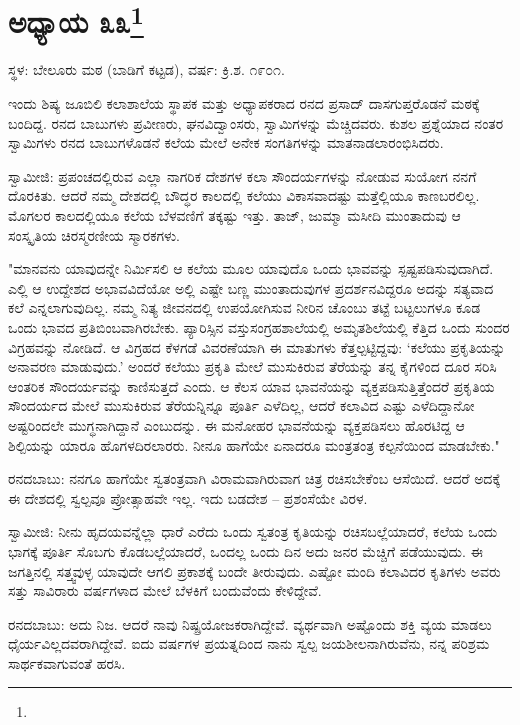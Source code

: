 \newpage

\chapter[ಅಧ್ಯಾಯ ೩೩]{ಅಧ್ಯಾಯ ೩೩\protect\footnote{}}

\centerline{ಸ್ಥಳ: ಬೇಲೂರು ಮಠ (ಬಾಡಿಗೆ ಕಟ್ಟಡ), ವರ್ಷ: ಕ್ರಿ.ಶ. ೧೯೦೧.}

ಇಂದು ಶಿಷ್ಯ ಜೂಬಿಲಿ ಕಲಾಶಾಲೆಯ ಸ್ಥಾಪಕ ಮತ್ತು ಅಧ್ಯಾಪಕರಾದ ರನದ ಪ್ರಸಾದ್ ದಾಸಗುಪ್ತರೊಡನೆ ಮಠಕ್ಕೆ ಬಂದಿದ್ದ. ರನದ ಬಾಬುಗಳು ಪ್ರವೀಣರು, ಘನವಿದ್ವಾಂಸರು, ಸ್ವಾಮಿಗಳನ್ನು ಮೆಚ್ಚಿದವರು. ಕುಶಲ ಪ್ರಶ್ನೆಯಾದ ನಂತರ ಸ್ವಾಮಿಗಳು ರನದ ಬಾಬುಗಳೊಡನೆ ಕಲೆಯ ಮೇಲೆ ಅನೇಕ ಸಂಗತಿಗಳನ್ನು ಮಾತನಾಡಲಾರಂಭಿಸಿದರು.

ಸ್ವಾಮೀಜಿ: ಪ್ರಪಂಚದಲ್ಲಿರುವ ಎಲ್ಲಾ ನಾಗರಿಕ ದೇಶಗಳ ಕಲಾ ಸೌಂದರ್ಯಗಳನ್ನು ನೋಡುವ ಸುಯೋಗ ನನಗೆ ದೊರಕಿತು. ಆದರೆ ನಮ್ಮ ದೇಶದಲ್ಲಿ ಬೌದ್ಧರ ಕಾಲದಲ್ಲಿ ಕಲೆಯು ವಿಕಾಸವಾದಷ್ಟು ಮತ್ತೆಲ್ಲಿಯೂ ಕಾಣಬರಲಿಲ್ಲ. ಮೊಗಲರ ಕಾಲದಲ್ಲಿಯೂ ಕಲೆಯ ಬೆಳವಣಿಗೆ ತಕ್ಕಷ್ಟು ಇತ್ತು. ತಾಜ್, ಜುಮ್ಮಾ ಮಸೀದಿ ಮುಂತಾದುವು ಆ ಸಂಸ್ಕೃತಿಯ ಚಿರಸ್ಮರಣೀಯ ಸ್ಮಾರಕಗಳು.

"ಮಾನವನು ಯಾವುದನ್ನೇ ನಿರ್ಮಿಸಲಿ ಆ ಕಲೆಯ ಮೂಲ ಯಾವುದೊ ಒಂದು ಭಾವವನ್ನು ಸ್ಪಷ್ಟಪಡಿಸುವುದಾಗಿದೆ. ಎಲ್ಲಿ ಆ ಉದ್ದೇಶದ ಅಭಾವವಿದೆಯೋ ಅಲ್ಲಿ ಎಷ್ಟೇ ಬಣ್ಣ ಮುಂತಾದುವುಗಳ ಪ್ರದರ್ಶನವಿದ್ದರೂ ಅದನ್ನು ಸತ್ಯವಾದ ಕಲೆ ಎನ್ನಲಾಗುವುದಿಲ್ಲ. ನಮ್ಮ ನಿತ್ಯ ಜೀವನದಲ್ಲಿ ಉಪಯೋಗಿಸುವ ನೀರಿನ ಚೊಂಬು ತಟ್ಟೆ ಬಟ್ಟಲುಗಳೂ ಕೂಡ ಒಂದು ಭಾವದ ಪ್ರತಿಬಿಂಬವಾಗಿರಬೇಕು. ಪ್ಯಾರಿಸ್ಸಿನ ವಸ್ತುಸಂಗ್ರಹಶಾಲೆಯಲ್ಲಿ ಅಮೃತಶಿಲೆಯಲ್ಲಿ ಕೆತ್ತಿದ ಒಂದು ಸುಂದರ ವಿಗ್ರಹವನ್ನು ನೋಡಿದೆ. ಆ ವಿಗ್ರಹದ ಕೆಳಗಡೆ ವಿವರಣೆಯಾಗಿ ಈ ಮಾತುಗಳು ಕೆತ್ತಲ್ಪಟ್ಟಿದ್ದವು: ‘ಕಲೆಯು ಪ್ರಕೃತಿಯನ್ನು ಅನಾವರಣ ಮಾಡುವುದು.’ ಅಂದರೆ ಕಲೆಯು ಪ್ರಕೃತಿ ಮೇಲೆ ಮುಸುಕಿರುವ ತೆರೆಯನ್ನು ತನ್ನ ಕೈಗಳಿಂದ ದೂರ ಸರಿಸಿ ಆಂತರಿಕ ಸೌಂದರ್ಯವನ್ನು ಕಾಣಿಸುತ್ತದೆ ಎಂದು. ಆ ಕೆಲಸ ಯಾವ ಭಾವನೆಯನ್ನು ವ್ಯಕ್ತಪಡಿಸುತ್ತಿತ್ತೆಂದರೆ ಪ್ರಕೃತಿಯ ಸೌಂದರ್ಯದ ಮೇಲೆ ಮುಸುಕಿರುವ ತೆರೆಯನ್ನಿನ್ನೂ ಪೂರ್ತಿ ಎಳೆದಿಲ್ಲ, ಆದರೆ ಕಲಾವಿದ ಎಷ್ಟು ಎಳೆದಿದ್ದಾನೋ ಅಷ್ಟರಿಂದಲೇ ಮುಗ್ಧನಾಗಿದ್ದಾನೆ ಎಂಬುದನ್ನು. ಈ ಮನೋಹರ ಭಾವನೆಯನ್ನು ವ್ಯಕ್ತಪಡಿಸಲು ಹೊರಟಿದ್ದ ಆ ಶಿಲ್ಪಿಯನ್ನು ಯಾರೂ ಹೊಗಳದಿರಲಾರರು. ನೀನೂ ಹಾಗೆಯೇ ಏನಾದರೂ ಮಂತ್ರತಂತ್ರ ಕಲ್ಪನೆಯಿಂದ ಮಾಡಬೇಕು."

ರನದಬಾಬು: ನನಗೂ ಹಾಗೆಯೇ ಸ್ವತಂತ್ರವಾಗಿ ವಿರಾಮವಾಗಿರುವಾಗ ಚಿತ್ರ ರಚಿಸಬೇಕೆಂಬ ಆಸೆಯಿದೆ. ಆದರೆ ಅದಕ್ಕೆ ಈ ದೇಶದಲ್ಲಿ ಸ್ವಲ್ಪವೂ ಪ್ರೋತ್ಸಾಹವೇ ಇಲ್ಲ. ಇದು ಬಡದೇಶ – ಪ್ರಶಂಸೆಯೇ ವಿರಳ.

ಸ್ವಾಮೀಜಿ: ನೀನು ಹೃದಯವನ್ನೆಲ್ಲಾ ಧಾರೆ ಎರೆದು ಒಂದು ಸ್ವತಂತ್ರ ಕೃತಿಯನ್ನು ರಚಿಸಬಲ್ಲೆಯಾದರೆ, ಕಲೆಯ ಒಂದು ಭಾಗಕ್ಕೆ ಪೂರ್ತಿ ಸೊಬಗು ಕೊಡಬಲ್ಲೆಯಾದರೆ, ಒಂದಲ್ಲ ಒಂದು ದಿನ ಅದು ಜನರ ಮೆಚ್ಚಿಗೆ ಪಡೆಯುವುದು. ಈ ಜಗತ್ತಿನಲ್ಲಿ ಸತ್ತ್ವವುಳ್ಳ ಯಾವುದೇ ಆಗಲಿ ಪ್ರಕಾಶಕ್ಕೆ ಬಂದೇ ತೀರುವುದು. ಎಷ್ಟೋ ಮಂದಿ ಕಲಾವಿದರ ಕೃತಿಗಳು ಅವರು ಸತ್ತು ಸಾವಿರಾರು ವರ್ಷಗಳಾದ ಮೇಲೆ ಬೆಳಕಿಗೆ ಬಂದುವೆಂದು ಕೇಳಿದ್ದೇವೆ.

ರನದಬಾಬು: ಅದು ನಿಜ. ಆದರೆ ನಾವು ನಿಷ್ಪ್ರಯೋಜಕರಾಗಿದ್ದೇವೆ. ವ್ಯರ್ಥವಾಗಿ ಅಷ್ಟೊಂದು ಶಕ್ತಿ ವ್ಯಯ ಮಾಡಲು ಧೈರ್ಯವಿಲ್ಲದವರಾಗಿದ್ದೇವೆ. ಐದು ವರ್ಷಗಳ ಪ್ರಯತ್ನದಿಂದ ನಾನು ಸ್ವಲ್ಪ ಜಯಶೀಲನಾಗಿರುವೆನು, ನನ್ನ ಪರಿಶ್ರಮ ಸಾರ್ಥಕವಾಗುವಂತೆ ಹರಸಿ.

